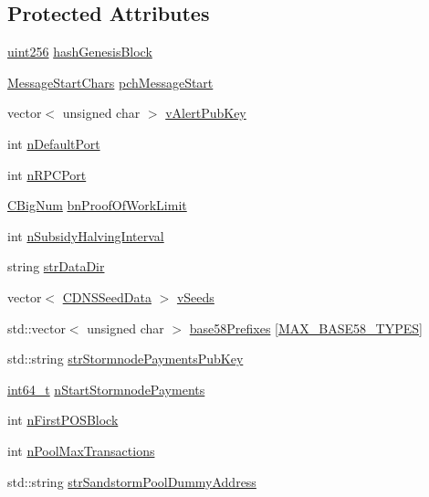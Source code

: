 \subsection*{Protected Attributes}
\begin{DoxyCompactItemize}
\item 
\hyperlink{classuint256}{uint256} \hyperlink{class_c_chain_params_a3033bae1b7e966358f80b6cbb2e2a3d8}{hash\+Genesis\+Block}
\item 
\hyperlink{chainparams_8h_a606a5a0100b84686ef50bf2cb2a591a0}{Message\+Start\+Chars} \hyperlink{class_c_chain_params_a06130a926927697ae8a6c211a60233a7}{pch\+Message\+Start}
\item 
vector$<$ unsigned char $>$ \hyperlink{class_c_chain_params_a9c48773a65415e2ecac36556f93daf1d}{v\+Alert\+Pub\+Key}
\item 
int \hyperlink{class_c_chain_params_a76d9a8dc59e179ca94b6b9e04a93e5f4}{n\+Default\+Port}
\item 
int \hyperlink{class_c_chain_params_a0f7d46a1493876d522cb594cc8e7924f}{n\+R\+P\+C\+Port}
\item 
\hyperlink{class_c_big_num}{C\+Big\+Num} \hyperlink{class_c_chain_params_a31b98a48c662682f3e94564e1fa08608}{bn\+Proof\+Of\+Work\+Limit}
\item 
int \hyperlink{class_c_chain_params_a8618df6217285a39e86d44fba35a21af}{n\+Subsidy\+Halving\+Interval}
\item 
string \hyperlink{class_c_chain_params_ac426f66d4f4cf1c62151839a3f766d47}{str\+Data\+Dir}
\item 
vector$<$ \hyperlink{struct_c_d_n_s_seed_data}{C\+D\+N\+S\+Seed\+Data} $>$ \hyperlink{class_c_chain_params_ad62171f08f60fe9cce01636df7d0839f}{v\+Seeds}
\item 
std\+::vector$<$ unsigned char $>$ \hyperlink{class_c_chain_params_a923d956c5d3891d0c682b7ef5410ed8f}{base58\+Prefixes} \mbox{[}\hyperlink{class_c_chain_params_aa294058ec2e3586bd8d03d6c39667058a6b21a525c7fab64a5df656e708f71a98}{M\+A\+X\+\_\+\+B\+A\+S\+E58\+\_\+\+T\+Y\+P\+E\+S}\mbox{]}
\item 
std\+::string \hyperlink{class_c_chain_params_a3ade9f41f8926331f4eb6aa1417444d3}{str\+Stormnode\+Payments\+Pub\+Key}
\item 
\hyperlink{stdint_8h_adec1df1b8b51cb32b77e5b86fff46471}{int64\+\_\+t} \hyperlink{class_c_chain_params_a585cae2a6611f610e2ff269a8e9ada34}{n\+Start\+Stormnode\+Payments}
\item 
int \hyperlink{class_c_chain_params_ac02f29aa14f74f88b64b7d8d71329a49}{n\+First\+P\+O\+S\+Block}
\item 
int \hyperlink{class_c_chain_params_addb1962eb12784aaea932fd49b5fd40b}{n\+Pool\+Max\+Transactions}
\item 
std\+::string \hyperlink{class_c_chain_params_aefacc57cc8df894c78529dbadcf7fc20}{str\+Sandstorm\+Pool\+Dummy\+Address}
\end{DoxyCompactItemize}


